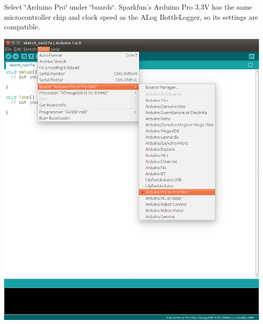 \begin{DoxyEnumerate}
\item Select \char`\"{}\+Arduino Pro\char`\"{} under \char`\"{}boards\char`\"{}. Sparkfun’s Arduino Pro 3.\+3V has the same microcontroller chip and clock speed as the A\+Log Bottle\+Logger, so its settings are compatible.  
\begin{DoxyImage}
\includegraphics[width=.8\linewidth]{BoardsSelect_ArduinoPro.png}
\caption{Sparkfun\textquotesingle{}s Arduino pro can have the same settings as the A\+Log.}
\end{DoxyImage}


\end{DoxyEnumerate}
